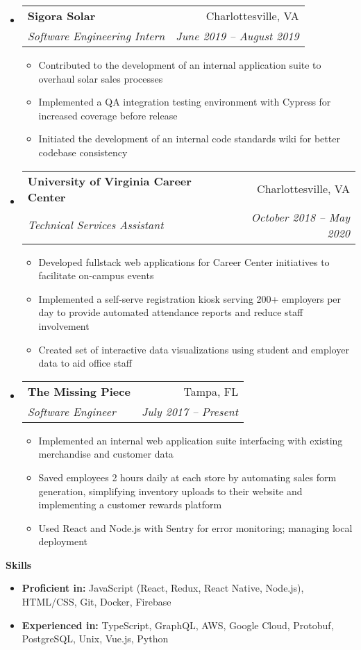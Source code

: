 \documentclass[letterpaper,12pt]{article}[leftmargin=*]
\makeatletter
\def \entryspacing {-0pt}
\renewcommand{\section}[2]{\vspace{5pt}
  \colorbox{secondary}{\color{white}\raggedbottom\normalsize\textbf{{#1}{\hspace{7pt}#2}}}
}
\newcommand{\resumeEntryStart}{\begin{itemize}[leftmargin=2.5mm]}
\newcommand{\resumeEntryEnd}{\end{itemize}\vspace{\entryspacing}}
\newcommand{\resumeItemListStart}{\begin{itemize}[leftmargin=4.5mm]}
\newcommand{\resumeItemListEnd}{\end{itemize}}
\newcommand{\resumeItem}[1]{
  \item\small{
    {#1 \vspace{-2pt}}
  }
}
\newcommand{\resumeEntryTSDL}[4]{
  \vspace{-1pt}\item[]
    \begin{tabular*}{0.97\textwidth}{l@{\extracolsep{\fill}}r}
      \textbf{\color{primary}#1} & {\firabook\color{accent}\small#2} \\
      \textit{\color{accent}\small#3} & \textit{\color{accent}\small#4} \\
    \end{tabular*}\vspace{-7pt}
}
\newcommand{\resumeEntryS}[2]{
  \item[]\small{
    \textbf{\color{primary}#1} #2\vspace{-6pt}
  }
}
\makeatother
\begin{document}
  \resumeEntryStart
    \resumeEntryTSDL
      {Sigora Solar}
      {Charlottesville, VA}
      {Software Engineering Intern}
      {June 2019 -- August 2019}
    \resumeItemListStart
      \resumeItem {Contributed to the development of an internal application suite to overhaul solar sales processes}
      \resumeItem {Implemented a QA integration testing environment with Cypress for increased coverage before release}
      \resumeItem {Initiated the development of an internal code standards wiki for better codebase consistency}
    \resumeItemListEnd
  \resumeEntryEnd

  \resumeEntryStart
    \resumeEntryTSDL
      {University of Virginia Career Center}
      {Charlottesville, VA}
      {Technical Services Assistant}
      {October 2018 -- May 2020}
    \resumeItemListStart
      \resumeItem {Developed fullstack web applications for Career Center initiatives to facilitate on-campus events}
      \resumeItem {Implemented a self-serve registration kiosk serving 200+ employers per day to provide automated attendance reports and reduce staff involvement}
      \resumeItem {Created set of interactive data visualizations using student and employer data to aid office staff}
    \resumeItemListEnd
  \resumeEntryEnd

  \resumeEntryStart
    \resumeEntryTSDL
      {The Missing Piece}
      {Tampa, FL}
      {Software Engineer}
      {July 2017 -- Present}
    \resumeItemListStart
      \resumeItem {Implemented an internal web application suite interfacing with existing merchandise and customer data}
      \resumeItem {Saved employees 2 hours daily at each store by automating sales form generation, simplifying inventory uploads to their website and implementing a customer rewards platform}
      \resumeItem {Used React and Node.js with Sentry for error monitoring; managing local deployment}
    \resumeItemListEnd
  \resumeEntryEnd

\section{\faGears}{Skills}
  \resumeEntryStart
  \resumeEntryS
    {Proficient in:}
    {JavaScript (React, Redux, React Native, Node.js), HTML/CSS, Git, Docker, Firebase}
  \resumeEntryS
    {Experienced in:}
    {TypeScript, GraphQL, AWS, Google Cloud, Protobuf, PostgreSQL, Unix, Vue.js, Python}
  \resumeEntryEnd
\end{document}

